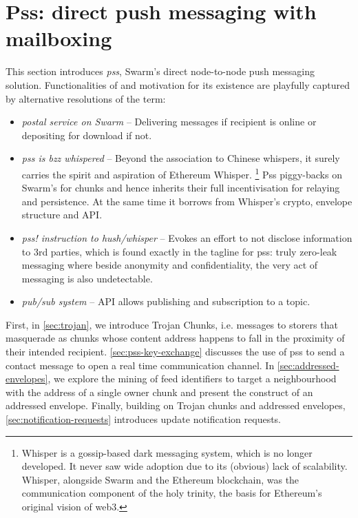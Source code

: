 \section{Pss: direct push messaging with mailboxing \statusgreen}\label{sec:pss}

\green{}

This section introduces \emph{pss}, Swarm's direct node-to-node push messaging solution. 
Functionalities of and motivation for its existence are playfully captured by alternative resolutions of the term:

\begin{itemize}[noitemsep]
\item \emph{postal service on Swarm} -- Delivering messages if recipient is online or depositing for download if not.
\item \emph{pss is bzz whispered} -- Beyond the association to Chinese whispers, it surely carries the spirit and aspiration of Ethereum Whisper.%
%
\footnote{Whisper is a gossip-based dark messaging system, which is no longer developed. It never saw wide adoption due to its (obvious) lack of scalability. Whisper, alongside Swarm and the Ethereum blockchain, was the communication component of the holy trinity, the basis for Ethereum's original vision of web3.}
%
Pss piggy-backs on Swarm's  for chunks and hence inherits their full incentivisation for relaying and persistence. At the same time it borrows from Whisper's crypto, envelope structure and API.
\item \emph{pss! instruction to hush/whisper} -- Evokes an effort to not disclose information to 3rd parties, which is found exactly in the tagline for pss: truly zero-leak messaging where beside anonymity and confidentiality, the very act of messaging is also undetectable.
\item  \emph{pub/sub system} -- API allows publishing and subscription to a topic.
\end{itemize}

First, in \ref{sec:trojan}, we introduce Trojan Chunks, i.e. messages to storers that masquerade as chunks whose content address happens to fall in the proximity of their intended recipient. 
\ref{sec:pss-key-exchange} discusses the use of pss to send a contact message to open a real time communication channel.
In \ref{sec:addressed-envelopes}, we explore the mining of feed identifiers to target a neighbourhood with the address of a single owner chunk and present the construct of an addressed envelope. Finally, building on Trojan chunks and addressed envelopes, \ref{sec:notification-requests} introduces update notification requests.

